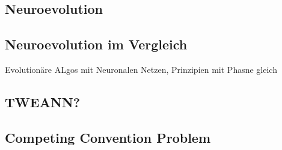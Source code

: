 \subsection{Neuroevolution}



\subsection{Neuroevolution im Vergleich}
Evolutionäre ALgos mit Neuronalen Netzen, Prinzipien mit Phasne gleich


\subsection{TWEANN?}
\label{subsec:tweann}
\subsection{Competing Convention Problem}
\label{subsec:competing_convention_problem}

